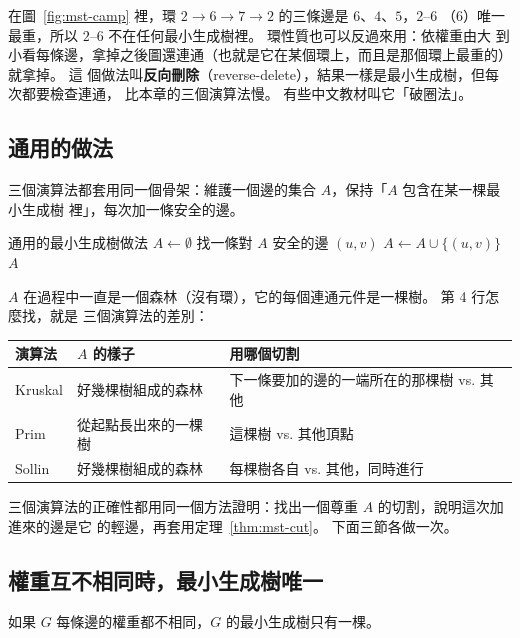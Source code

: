 在圖~\ref{fig:mst-camp} 裡，環 $2 \to 6 \to 7 \to 2$ 的三條邊是 $6$、$4$、$5$，$2$--$6$
（$6$）唯一最重，所以 $2$--$6$ 不在任何最小生成樹裡。 環性質也可以反過來用：依權重由大
到小看每條邊，拿掉之後圖還連通（也就是它在某個環上，而且是那個環上最重的）就拿掉。 這
個做法叫\textbf{反向刪除}（reverse-delete），結果一樣是最小生成樹，但每次都要檢查連通，
比本章的三個演算法慢。 有些中文教材叫它「破圈法」。

\subsection{通用的做法}

三個演算法都套用同一個骨架：維護一個邊的集合 $A$，保持「$A$ 包含在某一棵最小生成樹
裡」，每次加一條安全的邊。

\begin{pseudo}[label=alg:mst-generic]{通用的最小生成樹做法}
    \State $A \gets \emptyset$
        \State 找一條對 $A$ 安全的邊 $(u, v)$
        \State $A \gets A \cup \{(u, v)\}$
    \EndWhile
    \State \Return $A$
\EndProcedure
\end{pseudo}

$A$ 在過程中一直是一個森林（沒有環），它的每個連通元件是一棵樹。 第 4 行怎麼找，就是
三個演算法的差別：

\begin{center}
\small
\begin{tabular}{lll}
\toprule
演算法 & $A$ 的樣子 & 用哪個切割 \\
\midrule
Kruskal & 好幾棵樹組成的森林 & 下一條要加的邊的一端所在的那棵樹 vs. 其他 \\
Prim & 從起點長出來的一棵樹 & 這棵樹 vs. 其他頂點 \\
Sollin & 好幾棵樹組成的森林 & 每棵樹各自 vs. 其他，同時進行 \\
\bottomrule
\end{tabular}
\end{center}

三個演算法的正確性都用同一個方法證明：找出一個尊重 $A$ 的切割，說明這次加進來的邊是它
的輕邊，再套用定理~\ref{thm:mst-cut}。 下面三節各做一次。

\subsection{權重互不相同時，最小生成樹唯一}

\begin{theorem}
\label{thm:mst-unique}
如果 $G$ 每條邊的權重都不相同，$G$ 的最小生成樹只有一棵。
\end{theorem}

